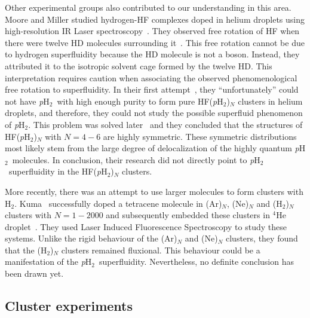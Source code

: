 \documentclass[12pt]{iopart}
\newcommand{\hydrogen}{H$_2$}
\newcommand{\phtwo}{{\em p}H$_2$}
\begin{document}
Other experimental groups also contributed to our understanding in this area. Moore and Miller studied hydrogen-HF complexes doped in helium droplets using high-resolution IR Laser spectroscopy~\cite{more_miller_h2_hf, moore_miller_hd_hf,moore_HF_H2}. 
They observed free rotation of HF when there were twelve HD molecules surrounding it~\cite{moore_miller_hd_hf}. 
This free rotation cannot be due to hydrogen superfluidity because the HD molecule is not a boson. 
Instead, they attributed it to the isotropic solvent cage formed by the twelve HD. 
This interpretation requires caution when associating the observed phenomenological free rotation to superfluidity. 
In their first attempt~\cite{moore_HF_H2}, they ``unfortunately'' could not have \phtwo~with high enough purity to form pure HF(\phtwo)$_N$ clusters in helium droplets, and therefore, they could not study the possible superfluid phenomenon of \phtwo. 
This problem was solved later~\cite{moore_HF_H2_2} and they concluded that the structures of HF(\phtwo)$_N$ with $N=4-6$ are highly symmetric. 
These symmetric distributions most likely stem from the large degree of delocalization of the highly quantum \phtwo~molecules. 
In conclusion, their research did not directly point to \phtwo~superfluidity in the HF(\phtwo)$_N$ clusters.

More recently, there was an attempt to use larger molecules to form clusters with \hydrogen. Kuma \etal~successfully doped a tetracene molecule in (Ar)$_N$, (Ne)$_N$ and (\hydrogen)$_N$ clusters with $N=1-2000$ and subsequently embedded these clusters in $^4$He droplet~\cite{tetracene_h2}. 
They used Laser Induced Fluorescence Spectroscopy to study these systems. 
Unlike the rigid behaviour of the (Ar)$_N$ and (Ne)$_N$ clusters, they found that the (\hydrogen)$_N$ clusters remained fluxional. 
This behaviour could be a manifestation of the \phtwo~superfluidity. Nevertheless, no definite conclusion has been drawn yet.

\subsection{Cluster experiments} \label{subsec:exp_cluster}
\end{document}
